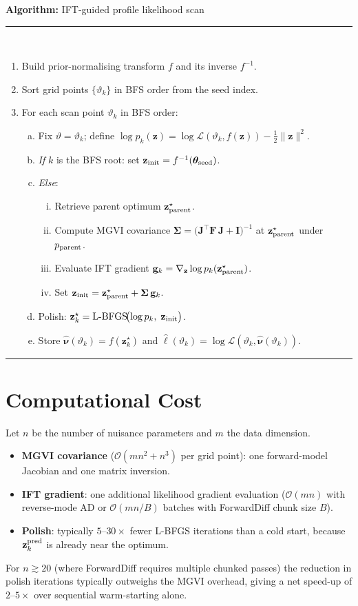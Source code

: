\documentclass[11pt, a4paper]{article}
\newcommand{\nupar}{\bm{\nu}}
\newcommand{\zz}{\mathbf{z}}
\newcommand{\Sig}{\boldsymbol{\Sigma}}
\newenvironment{pseudocode}[1]{%
  \bigskip
  \noindent\textbf{Algorithm:} #1\\[-0.3em]
  \noindent\rule{\linewidth}{0.8pt}\\[-0.5em]
  \noindent\begin{enumerate}
}{%
  \end{enumerate}
  \noindent\rule{\linewidth}{0.4pt}
  \bigskip
}
\begin{document}
\begin{pseudocode}{IFT-guided profile likelihood scan}
  \item Build prior-normalising transform $f$ and its inverse $f^{-1}$.
  \item Sort grid points $\{\vartheta_k\}$ in BFS order from the seed index.
  \item For each scan point $\vartheta_k$ in BFS order:
    \begin{enumerate}[(a)]
      \item Fix $\vartheta = \vartheta_k$;
            define $\log p_k(\zz)= \log\mathcal{L}(\vartheta_k, f(\zz))
            - \tfrac12\|\zz\|^2$.
      \item \textit{If} $k$ is the BFS root: set
            $\zz_{\rm init} = f^{-1}(\bm{\theta}_{\rm seed})$.
      \item \textit{Else}:
        \begin{enumerate}[(i)]
          \item Retrieve parent optimum $\zz^\star_{\rm parent}$.
          \item Compute MGVI covariance $\Sig = \bigl(\mathbf{J}^\top
                \mathbf{F}\,\mathbf{J}+\mathbf{I}\bigr)^{-1}$
                at $\zz^\star_{\rm parent}$ under $p_{\rm parent}$.
          \item Evaluate IFT gradient
                $\mathbf{g}_k = \nabla_\zz \log p_k(\zz^\star_{\rm parent})$.
          \item Set $\zz_{\rm init} = \zz^\star_{\rm parent}
                + \Sig\,\mathbf{g}_k$.
        \end{enumerate}
      \item Polish: $\zz^\star_k =
            \text{L-BFGS}\!\bigl(\log p_k,\;\zz_{\rm init}\bigr)$.
      \item Store $\hat{\nupar}(\vartheta_k) = f(\zz^\star_k)$ and
            $\hat\ell(\vartheta_k) = \log\mathcal{L}(\vartheta_k,
            \hat{\nupar}(\vartheta_k))$.
    \end{enumerate}
\end{pseudocode}

\section{Computational Cost}

Let $n$ be the number of nuisance parameters and $m$ the data dimension.

\begin{itemize}
  \item \textbf{MGVI covariance} ($\mathcal{O}(mn^2 + n^3)$ per grid point):
    one forward-model Jacobian and one matrix inversion.
  \item \textbf{IFT gradient}: one additional likelihood gradient evaluation
    ($\mathcal{O}(mn)$ with reverse-mode AD or $\mathcal{O}(mn/B)$ batches
    with ForwardDiff chunk size $B$).
  \item \textbf{Polish}: typically $5$--$30\times$ fewer L-BFGS iterations than
    a cold start, because $\zz^{\rm pred}_k$ is already near the optimum.
\end{itemize}

For $n \gtrsim 20$ (where ForwardDiff requires multiple chunked passes) the
reduction in polish iterations typically outweighs the MGVI overhead, giving a
net speed-up of $2$--$5\times$ over sequential warm-starting alone.
\end{document}
